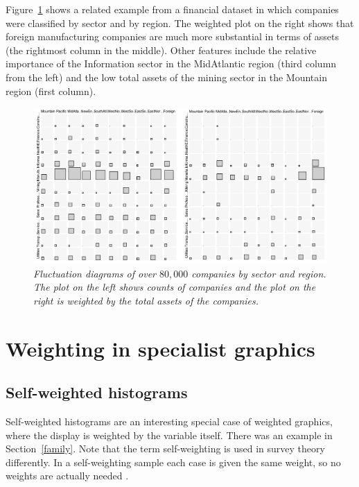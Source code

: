\documentclass{svmult}
\begin{document}
Figure~\ref{indreg} shows a related example from a financial dataset in which companies were classified by sector and by region.  The weighted plot on the right shows that foreign manufacturing companies are much more substantial in terms of assets (the rightmost column in the middle).  Other features include the relative importance of the Information sector in the MidAtlantic region (third column from the left) and the low total assets of the mining sector in the Mountain region (first column).

\begin{figure}[htbp]
  \centering
  \includegraphics[width=\linewidth]{IndRegAndWtd}
  \caption{\label{indreg}\em Fluctuation diagrams of over $80,000$ companies by sector and region.  The plot on the left shows counts of companies and the plot on the right is weighted by the total assets of the companies.}
\end{figure}

\section{Weighting in specialist graphics}
\label{spec}

\subsection{Self-weighted histograms}
\label{shist}
Self-weighted histograms are an interesting special case of weighted graphics, where the display is weighted by the variable itself.  There was an example in Section~\ref{family}.  Note that the term self-weighting is used in survey theory differently.  In a self-weighting sample each case is given the same weight, so no weights are actually needed \citep{cochran:1954a}.
\end{document}
